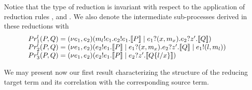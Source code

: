 Notice that the type of reduction is invariant with respect to the application of reduction rules ,  and .
We also denote the intermediate sub-processes derived in these reductions with %
\[
\begin{array}{@{}l@{\;}c@{\;}l}
\Proc_1^\NL(\PP,\PQ) & = &  \rest{\NE_1,\NE_2}( \send{\NM_\NL}\role\msg{\NE_1}.\send{\NE_2}\role\msg{\NE_1}.  \enc{ \PP } \parop \receive{\NE_1}\role\msg{(\NX,\NM_\NX)}.\receive{\NE_2}\role\msg{\NZ'}. \enc{\PQ})\\
\Proc_2^\NL(\PP,\PQ) & = & \rest{\NE_1,\NE_2}( \send{\NE_2}\role\msg{\NE_1}.  \enc{ \PP }
  \parop  \receive{\NE_1}\role\msg{(\NX,\NM_\NX)}.\receive{\NE_2}\role\msg{\NZ'}. \enc{\PQ}  \parop  \send{\NE_1}\role\msg{(\NL,\NM_\NL)})\\
  \Proc_3^\NL(\PP, \PQ) & = & \rest{\NE_1,\NE_2}( \send{\NE_2}\role\msg{\NE_1}.  \enc{ \PP }
  \parop  \receive{\NE_2}\role\msg{\NZ'}. \enc{\PQ\subst{\NL}{\NX}} )
\end{array}
\]

We may present now our first result characterizing the structure of the reducing target term and its correlation with the corresponding source term.


